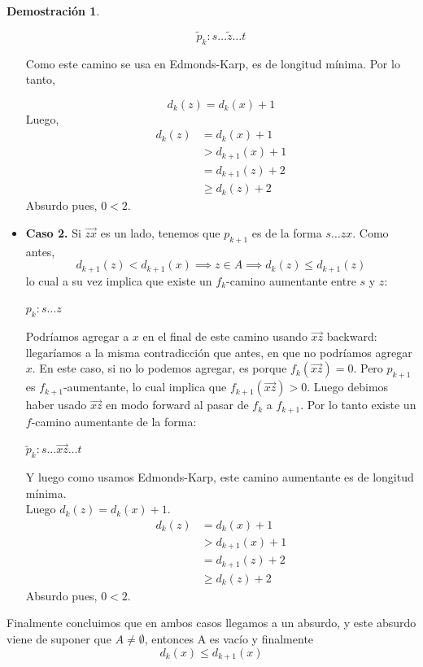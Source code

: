 \documentclass[11pt, a4paper]{article}
\theoremstyle{definition}
\newtheorem*{demostracion}{Demostración}
\begin{document}
\begin{demostracion}
\begin{itemize}
        \[ 
        \tilde{p}_k : s \ldots \tilde{z} \ldots t 
        \]
        
        Como este camino se usa en Edmonds-Karp, es de longitud mínima. Por lo tanto,
        
        \[ d_k(z) = d_k(x) + 1 \]Luego,
        \begin{align*}
            d_k(z) & = d_k(x) + 1 \\
                   & > d_{k+1}(x) + 1 \\
                   & = d_{k+1}(z) + 2 \\
                   & \geq d_k(z) + 2
        \end{align*}
        Absurdo pues, $0 < 2$.
        


        \item \textbf{Caso 2.} Si $\overrightarrow{zx}$ es un lado, tenemos que $p_{k+1}$ es de la forma $s \ldots zx$. Como antes, 
        \[ d_{k+1}(z) < d_{k+1}(x) \implies z \in A \implies d_k(z) \leq d_{k+1}(z) \]
        lo cual a su vez implica que existe un $f_k$-camino aumentante entre $s$ y $z$:
        \begin{center}
            $p_k: s \ldots z$
        \end{center}
        Podríamos agregar a $x$ en el final de este camino usando $\overrightarrow{xz}$ backward: llegaríamos a la misma contradicción que antes, en 
        que no podríamos agregar $x$. En este caso, si no lo podemos agregar, es porque $f_k(\overrightarrow{xz})=0$. Pero $p_{k+1}$ es 
        $f_{k+1}$-aumentante, lo cual implica que $f_{k+1}(\overrightarrow{xz})>0$. Luego debimos haber usado $\overrightarrow{xz}$ en modo forward al 
        pasar de $f_k$ a $f_{k+1}$. Por lo tanto existe un $f$-camino aumentante de la forma:
        \begin{center}
            $\tilde{p}_k: s \ldots \overrightarrow{xz} \ldots t$
        \end{center}
        Y luego como usamos Edmonds-Karp, este camino aumentante es de longitud mínima.\\
        Luego $d_k(z) = d_k(x) + 1$.\\
        \begin{align*}
            d_k(z) & = d_k(x) + 1 \\
                   & > d_{k+1}(x) + 1 \\
                   & = d_{k+1}(z) + 2 \\
                   & \geq d_k(z) + 2
        \end{align*}
        Absurdo pues, $0 < 2$. 
    \end{itemize}
    Finalmente concluimos que en ambos casos llegamos a un absurdo, y este absurdo viene de suponer que \({A \ne \emptyset}\), entonces A es vacío y finalmente 
    \[ d_k(x) \leq d_{k+1}(x) \]
\end{demostracion}
\end{document}
